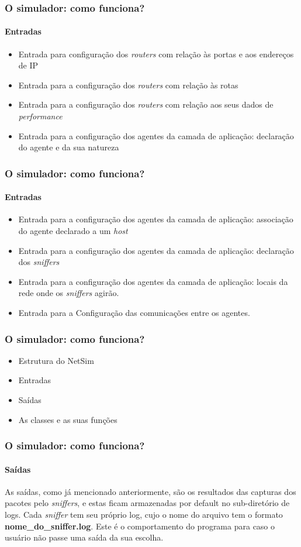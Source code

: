 \documentclass{beamer}
\begin{document}
\begin{frame}
	\frametitle{O simulador: como funciona?}
	\framesubtitle{Entradas}
	\begin{itemize}
		\item Entrada para configuração dos \textit{routers} com relação às portas e aos endereços de IP
		\item Entrada para a configuração dos \textit{routers} com relação às rotas
		\item Entrada para a configuração dos \textit{routers} com relação aos seus dados de \textit{performance}
		\item Entrada para a configuração dos agentes da camada de aplicação: declaração do agente e da sua natureza 
	\end{itemize}
\end{frame}

\begin{frame}
	\frametitle{O simulador: como funciona?}
	\framesubtitle{Entradas}
	\begin{itemize}
		\item Entrada para a configuração dos agentes da camada de aplicação: associação do agente declarado a um \textit{host}
		\item Entrada para a configuração dos agentes da camada de aplicação: declaração dos \textit{sniffers}
		\item Entrada para a configuração dos agentes da camada de aplicação: locais da rede onde os \textit{sniffers} agirão.
		\item Entrada para a Configuração das comunicações entre os agentes.
	\end{itemize}
\end{frame}

\begin{frame}
	\frametitle{O simulador: como funciona?}
	\begin{itemize}
		\item \textcolor{covered}{Estrutura do NetSim}
		\item \textcolor{covered}{Entradas}
		\item Saídas
		\item As classes e as suas funções
	\end{itemize}
\end{frame}

\begin{frame}
	\frametitle{O simulador: como funciona?}
	\framesubtitle{Saídas}
	As saídas, como já mencionado anteriormente, são os resultados das capturas dos pacotes pelo \textit{sniffers}, e estas
	ficam armazenadas por default no sub-diretório de logs. Cada \textit{sniffer} tem seu próprio log, cujo o nome do arquivo tem o formato
	\textbf{nome\_do\_sniffer.log}. Este é o comportamento do programa para caso o usuário não passe uma saída da sua escolha. 
\end{frame}
\end{document}

